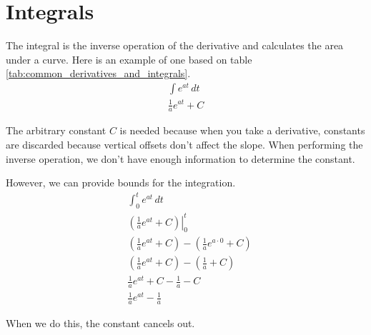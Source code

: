\section{Integrals}

The integral is the inverse operation of the derivative and calculates the area
under a curve. Here is an example of one based on table
\ref{tab:common_derivatives_and_integrals}.
\begin{align*}
  \int e^{at} \,dt \\
  \frac{1}{a}e^{at} + C
\end{align*}

The arbitrary constant $C$ is needed because when you take a derivative,
constants are discarded because vertical offsets don't affect the slope. When
performing the inverse operation, we don't have enough information to determine
the constant.

However, we can provide bounds for the integration.
\begin{align*}
  &\int_0^t e^{at} \,dt \\
  &\left.\left(\frac{1}{a}e^{at} + C\right)\right\vert_0^t \\
  &\left(\frac{1}{a}e^{at} + C\right) -
    \left(\frac{1}{a}e^{a \cdot 0} + C\right) \\
  &\left(\frac{1}{a}e^{at} + C\right) - \left(\frac{1}{a} + C\right) \\
  &\frac{1}{a}e^{at} + C - \frac{1}{a} - C \\
  &\frac{1}{a}e^{at} - \frac{1}{a}
\end{align*}

When we do this, the constant cancels out.
